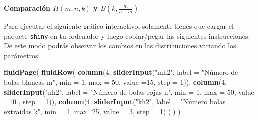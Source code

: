 \documentclass[]{book}
\newenvironment{Shaded}{\begin{snugshade}}{\end{snugshade}}
\newcommand{\DataTypeTok}[1]{\textcolor[rgb]{0.13,0.29,0.53}{#1}}
\newcommand{\DecValTok}[1]{\textcolor[rgb]{0.00,0.00,0.81}{#1}}
\newcommand{\KeywordTok}[1]{\textcolor[rgb]{0.13,0.29,0.53}{\textbf{#1}}}
\newcommand{\NormalTok}[1]{#1}
\newcommand{\StringTok}[1]{\textcolor[rgb]{0.31,0.60,0.02}{#1}}
\begin{document}
\textbf{Comparación \(H(m,n,k)\) y \(B\left(k,\frac{m}{n+m}\right)\)}

Para ejecutar el siguiente gráfico interactivo, solamente tienes que cargar el paquete \texttt{shiny} en tu ordenador y luego copiar/pegar las siguientes instrucciones. De este modo podrás observar los cambios en las distribuciones variando los parámetros.

\begin{Shaded}
\begin{Highlighting}[]
\KeywordTok{fluidPage}\NormalTok{(}
\KeywordTok{fluidRow}\NormalTok{(}
  \KeywordTok{column}\NormalTok{(}\DecValTok{4}\NormalTok{,}
         \KeywordTok{sliderInput}\NormalTok{(}\StringTok{"mh2"}\NormalTok{, }\DataTypeTok{label =} \StringTok{"Número de bolas blancas m"}\NormalTok{,}
              \DataTypeTok{min =} \DecValTok{1}\NormalTok{, }\DataTypeTok{max =} \DecValTok{50}\NormalTok{, }\DataTypeTok{value =}\DecValTok{15}\NormalTok{, }\DataTypeTok{step =} \DecValTok{1}\NormalTok{)),}
  \KeywordTok{column}\NormalTok{(}\DecValTok{4}\NormalTok{,}
         \KeywordTok{sliderInput}\NormalTok{(}\StringTok{"nh2"}\NormalTok{, }\DataTypeTok{label =} \StringTok{"Número de bolas rojas n"}\NormalTok{,}
              \DataTypeTok{min =} \DecValTok{1}\NormalTok{, }\DataTypeTok{max =} \DecValTok{50}\NormalTok{, }\DataTypeTok{value =}\DecValTok{10}\NormalTok{ , }\DataTypeTok{step =} \DecValTok{1}\NormalTok{)),}
  \KeywordTok{column}\NormalTok{(}\DecValTok{4}\NormalTok{,}
          \KeywordTok{sliderInput}\NormalTok{(}\StringTok{"kh2"}\NormalTok{, }\DataTypeTok{label =} \StringTok{"Número bolas extraídas k"}\NormalTok{,}
                     \DataTypeTok{min =} \DecValTok{1}\NormalTok{, }\DataTypeTok{max=}\DecValTok{25}\NormalTok{, }\DataTypeTok{value =} \DecValTok{3}\NormalTok{, }\DataTypeTok{step =} \DecValTok{1}\NormalTok{)}
\NormalTok{         )}
\NormalTok{  )}
\NormalTok{)}


\end{Highlighting}
\end{Shaded}
\end{document}
